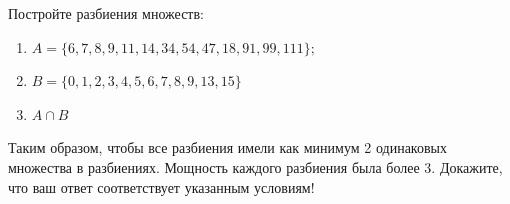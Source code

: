 \question
Постройте разбиения множеств:
\begin{enumerate}
	\renewcommand{\labelenumi}{\alph{enumi})}
	\item $A = \{6, 7, 8, 9, 11, 14, 34, 54, 47, 18, 91, 99,111\};$
	\item $B = \{0, 1, 2, 3, 4, 5, 6, 7, 8, 9, 13, 15\}$
	\item $A \cap B$
\end{enumerate}
Таким образом, чтобы все разбиения имели как минимум 2 одинаковых множества в разбиениях.
Мощность каждого разбиения была более 3.
Докажите, что ваш ответ соответствует указанным условиям!
